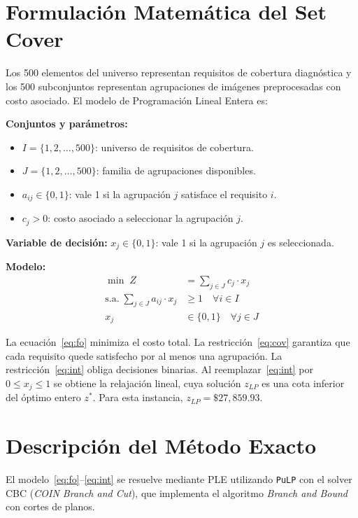 \documentclass[conference]{IEEEtran}
\begin{document}
\section{Formulación Matemática del Set Cover}

Los 500 elementos del universo representan requisitos de cobertura diagnóstica y los 500 subconjuntos representan agrupaciones de imágenes preprocesadas con costo asociado. El modelo de Programación Lineal Entera es:

\noindent\textbf{Conjuntos y parámetros:}
\begin{itemize}
\item $I = \{1, 2, \ldots, 500\}$: universo de requisitos de cobertura.
\item $J = \{1, 2, \ldots, 500\}$: familia de agrupaciones disponibles.
\item $a_{ij} \in \{0, 1\}$: vale 1 si la agrupación $j$ satisface el requisito $i$.
\item $c_j > 0$: costo asociado a seleccionar la agrupación $j$.
\end{itemize}

\noindent\textbf{Variable de decisión:}
$x_j \in \{0, 1\}$: vale 1 si la agrupación $j$ es seleccionada.

\noindent\textbf{Modelo:}
\begin{align}
\min \; Z &= \sum_{j \in J} c_j \cdot x_j \label{eq:fo}\\
\text{s.a.} \; \sum_{j \in J} a_{ij} \cdot x_j &\geq 1 \quad \forall i \in I \label{eq:cov}\\
x_j &\in \{0, 1\} \quad \forall j \in J \label{eq:int}
\end{align}

La ecuación~\eqref{eq:fo} minimiza el costo total. La restricción~\eqref{eq:cov} garantiza que cada requisito quede satisfecho por al menos una agrupación. La restricción~\eqref{eq:int} obliga decisiones binarias. Al reemplazar~\eqref{eq:int} por $0 \leq x_j \leq 1$ se obtiene la relajación lineal, cuya solución $z_{LP}$ es una cota inferior del óptimo entero $z^*$. Para esta instancia, $z_{LP} = \$27{,}859.93$.

\section{Descripción del Método Exacto}

El modelo~\eqref{eq:fo}--\eqref{eq:int} se resuelve mediante PLE utilizando \texttt{PuLP} con el solver CBC (\textit{COIN Branch and Cut}), que implementa el algoritmo \textit{Branch and Bound} con cortes de planos.
\end{document}

